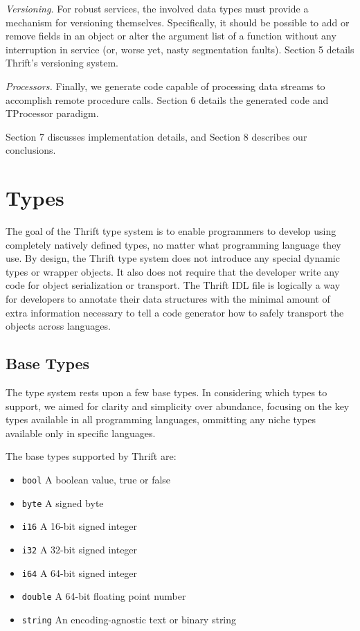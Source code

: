 \documentclass[nocopyrightspace,blockstyle]{sigplanconf}
\begin{document}
\textit{Versioning.} For robust services, the involved data types must
provide a mechanism for versioning themselves. Specifically,
it should be possible to add or remove fields in an object or alter the
argument list of a function without any interruption in service (or,
worse yet, nasty segmentation faults). Section 5 details Thrift's versioning
system.

\textit{Processors.} Finally, we generate code capable of processing data
streams to accomplish remote procedure calls. Section 6 details the generated
code and TProcessor paradigm.

Section 7 discusses implementation details, and Section 8 describes
our conclusions.

\section{Types}

The goal of the Thrift type system is to enable programmers to develop using
completely natively defined types, no matter what programming language they
use. By design, the Thrift type system does not introduce any special dynamic
types or wrapper objects. It also does not require that the developer write
any code for object serialization or transport. The Thrift IDL file is
logically a way for developers to annotate their data structures with the
minimal amount of extra information necessary to tell a code generator
how to safely transport the objects across languages.

\subsection{Base Types}

The type system rests upon a few base types. In considering which types to
support, we aimed for clarity and simplicity over abundance, focusing
on the key types available in all programming languages, ommitting any
niche types available only in specific languages.

The base types supported by Thrift are:
\begin{itemize}
\item \texttt{bool} A boolean value, true or false
\item \texttt{byte} A signed byte
\item \texttt{i16} A 16-bit signed integer
\item \texttt{i32} A 32-bit signed integer
\item \texttt{i64} A 64-bit signed integer
\item \texttt{double} A 64-bit floating point number
\item \texttt{string} An encoding-agnostic text or binary string
\end{itemize}
\end{document}
